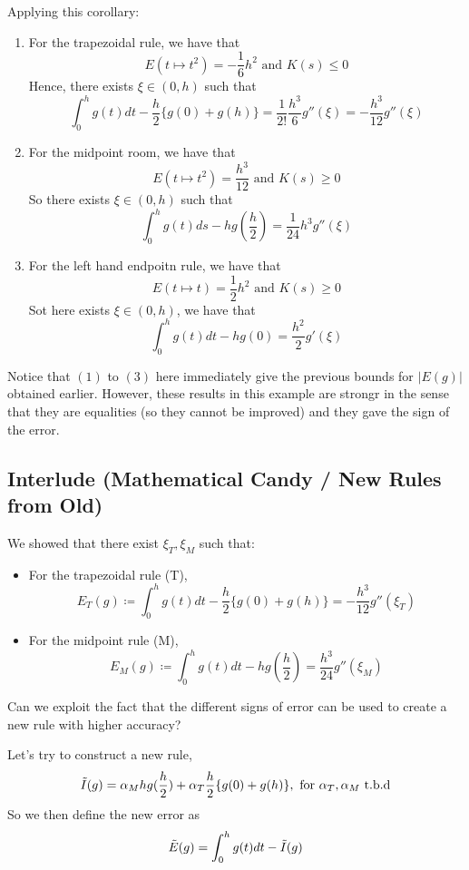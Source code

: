 \documentclass{article}
\begin{document}
\begin{example}Applying this corollary:
\begin{enumerate}
    \item For the trapezoidal rule, we have that
    \[E(t \mapsto t^2) = -\frac{1}{6} h^2 \text{ and } K(s) \leq 0\]
    Hence, there exists $\xi \in (0, h)$ such that
    \[\int_0^h g(t) dt - \frac{h}{2} \{g(0) + g(h)\} = \frac{1}{2!} \frac{h^3}{6} g''(\xi) = -\frac{h^3}{12} g''(\xi)\]
    \item For the midpoint room, we have that
    \[E(t \mapsto t^2) = \frac{h^3}{12} \text{ and } K(s) \geq 0\]
    So there exists $\xi \in (0, h)$ such that
    \[\int_0^h g(t) ds - h g(\frac{h}{2}) = \frac{1}{24} h^3 g''(\xi)\]
    \item For the left hand endpoitn rule, we have that
    \[E(t \mapsto t) = \frac{1}{2} h^2 \text{ and } K(s) \geq 0\]
    Sot here exists $\xi \in (0, h)$, we have that
    \[\int_0^h g(t) dt - h g(0) = \frac{h^2}{2} g'(\xi)\]
\end{enumerate}
    Notice that $(1)$ to $(3)$ here immediately give the previous bounds for $|E(g)|$ obtained earlier. However, these results in this example are strongr in the sense that they are equalities (so they cannot be improved) and they gave the sign of the error.
\end{example}

\subsection{Interlude (Mathematical Candy / New Rules from Old)}
 We showed that there exist $\xi_T, \xi_M$ such that:
 \begin{itemize}
     \item For the trapezoidal rule (T),
     \[E_T(g) \coloneqq \int_0^h g(t) dt - \frac{h}{2}\{g(0) + g(h)\} = -\frac{h^3}{12} g''(\xi_T)\]
     \item For the midpoint rule (M),
     \[E_M(g) \coloneqq \int_0^h g(t) dt - h g(\frac{h}{2}) = \frac{h^3}{24} g''(\xi_M) \]
 \end{itemize}

\begin{question}
Can we exploit the fact that the different signs of error can be used to create a new rule with higher accuracy?    
\end{question}

Let's try to construct a new rule,
\[\Tilde{I}(g) = \alpha_M h g(\frac{h}{2}) + \alpha_T \frac{h}{2} \{g(0) + g(h)\}, \text{ for $\alpha_T, \alpha_M$ t.b.d}\]
So we then define the new error as
\[\Tilde{E}(g) = \int_0^h g(t) dt - \Tilde{I}(g)\]
\end{document}
